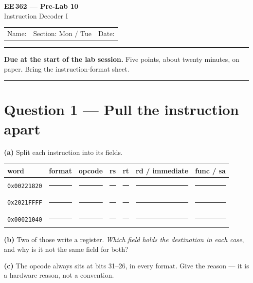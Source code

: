 \documentclass[11pt]{article}
\newcommand{\code}[1]{\texttt{#1}}
\newcommand{\answerbox}[1]{\vspace{2pt}\fbox{\parbox[c][#1][c]{\dimexpr\linewidth-2\fboxsep-2\fboxrule}{\ }}\vspace{4pt}}
\begin{document}
\begin{center}
{\Large\bfseries EE\,362 --- Pre-Lab 10}\\[2pt]
{\large Instruction Decoder I}\\[6pt]
\begin{tabular}{@{}p{6.5cm}p{4cm}p{4cm}@{}}
Name: \hrulefill & Section: Mon / Tue & Date: \hrulefill
\end{tabular}
\end{center}

\vspace{2pt}\hrule\vspace{4pt}

{\small\textbf{Due at the start of the lab session.} Five points, about twenty
minutes, on paper. Bring the instruction-format sheet.}

\vspace{4pt}\hrule

\section*{Question 1 --- Pull the instruction apart}

\textbf{(a)} Split each instruction into its fields.

\begin{center}
\begin{tabular}{lllllll}
\toprule
word & format & opcode & rs & rt & rd / immediate & func / sa \\
\midrule
\code{0x00221820} & \rule{1.4cm}{0.4pt} & \rule{1.6cm}{0.4pt} & \rule{1cm}{0.4pt} & \rule{1cm}{0.4pt} & \rule{2cm}{0.4pt} & \rule{1.6cm}{0.4pt} \\[6pt]
\code{0x2021FFFF} & \rule{1.4cm}{0.4pt} & \rule{1.6cm}{0.4pt} & \rule{1cm}{0.4pt} & \rule{1cm}{0.4pt} & \rule{2cm}{0.4pt} & \rule{1.6cm}{0.4pt} \\[6pt]
\code{0x00021040} & \rule{1.4cm}{0.4pt} & \rule{1.6cm}{0.4pt} & \rule{1cm}{0.4pt} & \rule{1cm}{0.4pt} & \rule{2cm}{0.4pt} & \rule{1.6cm}{0.4pt} \\
\bottomrule
\end{tabular}
\end{center}

\textbf{(b)} Two of those write a register. \emph{Which field holds the
destination in each case}, and why is it not the same field for both?

\answerbox{2.0cm}

\textbf{(c)} The opcode always sits at bits 31--26, in every format. Give the
reason --- it is a hardware reason, not a convention.
\end{document}
